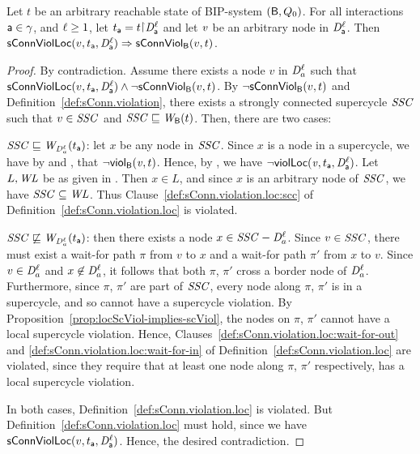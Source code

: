 \begin{proposition}
\label{prop:locConnViol-implies-ConnViol}
 \label{prop:locConnViol-implies-connViol}
Let $t$ be an arbitrary reachable state of BIP-system $(\mathsf{B}, Q_0)$.
For all interactions $\mathsf{a} \in \gamma$, and $\ell \ge 1$, let $t_\act = t \pj \dsk{\act}{\l}$ and let $\mathit{v}$ be an arbitrary node in $\mathit{D}_{\mathsf{a}}^{\ell}$.
Then\\
\ind $\mathsf{sConnViolLoc}(v,t_{\mathsf{a}},\mathit{D}_{\mathsf{a}}^{\ell}) \Rightarrow \mathsf{sConnViol}_{\mathsf{B}}(v,t)$.
\end{proposition}
%
\begin{proof}
By contradiction. Assume there exists a node $v$ in $\mathit{D}_{a}^{\ell}$ such that $\mathsf{sConnViolLoc}(v,t_{\mathsf{a}},\mathit{D}_{\mathsf{a}}^{\ell}) \land \neg \mathsf{sConnViol}_{\mathsf{B}}(v,t)$.
By $\neg \mathsf{sConnViol}_{\mathsf{B}}(v,t)$ and Definition~\ref{def:sConn.violation}, there exists a strongly connected
supercycle $\mathit{SSC}$ such that $v \in \mathit{SSC}$ and $\mathit{SSC} \sqsubseteq \mathit{W}_{\mathsf{B}}({t})$. Then, there are two cases:
%
\bn
\item $\mathit{SSC} \sqsubseteq \mathit{W}_{\mathit{D}_{a}^{\ell}}({t_{\mathsf{a}}})$: let $x$ be any node in $\mathit{SSC}$. Since $x$ is a node in a supercycle, we have by
   and , that $\neg \mathsf{viol}_{\mathsf{B}}(\mathit{v},t)$. %
   Hence, by ,  we have $\neg \mathsf{violLoc}(\mathit{v},t_{\mathsf{a}},\mathit{D}_{\mathsf{a}}^{\ell})$.    %
   Let $L, \mathit{WL}$ be as given in .
  Then $x \in L$, and since $x$ is an arbitrary node of $\mathit{SSC}$, we have $\mathit{SSC} \subseteq \mathit{WL}$. 
  Thus Clause~\ref{def:sConn.violation.loc:scc} of Definition~\ref{def:sConn.violation.loc} is violated.

\item $\mathit{SSC} \not\sqsubseteq \mathit{W}_{\mathit{D}_{a}^{\ell}}({t_{\mathsf{a}}})$: then there exists a node $x \in \mathit{SSC} -
  \mathit{D}_{a}^{\ell}$. Since $v \in \mathit{SSC}$, there must exist a wait-for path $\pi$
  from $v$ to $x$ and a wait-for path $\pi'$ from $x$ to
  $v$. Since $v \in \mathit{D}_{a}^{\ell}$ and $x \not\in \mathit{D}_{a}^{\ell}$, it
  follows that both $\pi$, $\pi'$  cross a border node of
  $\mathit{D}_{a}^{\ell}$. Furthermore, since $\pi$, $\pi'$ are part of $\mathit{SSC}$, every node
  along $\pi$, $\pi'$ is in a supercycle, and so cannot have a supercycle violation.
  By Proposition~\ref{prop:locScViol-implies-scViol}, the nodes on
  $\pi$, $\pi'$  cannot have a local supercycle violation.
  Hence, Clauses~\ref{def:sConn.violation.loc:wait-for-out} and
  \ref{def:sConn.violation.loc:wait-for-in} of Definition~\ref{def:sConn.violation.loc} are violated,
  since they require that at least one node along $\pi$, $\pi'$ respectively, has a local supercycle violation.
  
\en
In both cases,  Definition~\ref{def:sConn.violation.loc} is violated. 
But  Definition~\ref{def:sConn.violation.loc} must hold, since we have $\mathsf{sConnViolLoc}(v,t_{\mathsf{a}},\mathit{D}_{\mathsf{a}}^{\ell})$. 
Hence, the desired contradiction.
\end{proof}


